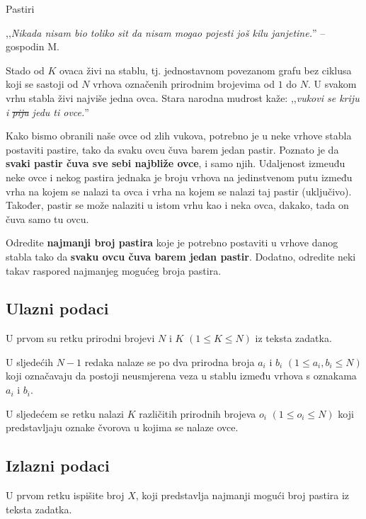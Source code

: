 \begin{statement}[
  problempoints=100,
  timelimit=1 sekunda,
  memorylimit=512 MiB,
]{Pastiri}

,,\textit{Nikada nisam bio toliko sit da nisam mogao pojesti još kilu
janjetine.}'' -- gospodin M.

Stado od $K$ ovaca živi na stablu, tj. jednostavnom povezanom grafu bez ciklusa
koji se sastoji od $N$ vrhova označenih prirodnim brojevima od $1$ do $N$.  U
svakom vrhu stabla živi najviše jedna ovca.  Stara narodna mudrost kaže:
,,\textit{vukovi se kriju i \sout{piju} jedu ti ovce.}''

Kako bismo obranili naše ovce od zlih vukova, potrebno je u neke vrhove stabla
postaviti pastire, tako da svaku ovcu čuva barem jedan pastir. Poznato je da
\textbf{svaki pastir čuva sve sebi najbliže ovce}, i samo njih. Udaljenost
izmeuđu neke ovce i nekog pastira jednaka je broju vrhova na jedinstvenom
putu između vrha na kojem se nalazi ta ovca i vrha na kojem se nalazi taj
pastir (uključivo). Također, pastir se
može nalaziti u istom vrhu kao i neka ovca, dakako, tada on čuva samo tu
ovcu.

Odredite \textbf{najmanji broj pastira} koje je potrebno postaviti u vrhove
danog stabla tako da \textbf{svaku ovcu čuva barem jedan pastir}. Dodatno,
odredite neki takav raspored najmanjeg mogućeg broja pastira.

\subsection*{Ulazni podaci}
U prvom su retku prirodni brojevi $N$ i $K$ $(1 \le K \le N)$ iz teksta zadatka.

U sljedećih $N-1$ redaka nalaze se po dva prirodna broja $a_i$ i $b_i$ $(1 \le
a_i, b_i \le N)$ koji označavaju da postoji neusmjerena veza u stablu između
vrhova s oznakama $a_i$ i $b_i$.

U sljedećem se retku nalazi $K$ različitih prirodnih brojeva $o_i$ $(1 \le o_i
\le N)$ koji predstavljaju oznake čvorova u kojima se nalaze ovce.

\subsection*{Izlazni podaci}
U prvom retku ispišite broj $X$, koji predstavlja najmanji mogući broj pastira
iz teksta zadatka.


\end{statement}

